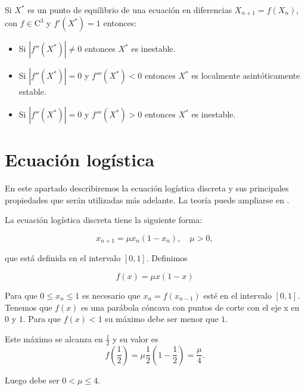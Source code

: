 \begin{proposition}
Si $X^*$ es un punto de equilibrio de una ecuación en diferencias $X_{n+1}=f(X_n)$, con $f\in\text{C}^3$ y $f'(X^*)=1$ entonces:
\begin{itemize}
\item Si $|f''(X^*)|\neq 0$ entonces $X^*$ es inestable.
\item Si $|f''(X^*)|=0$ y $f'''(X^*)<0$ entonces $X^*$ es localmente asintóticamente estable.
\item Si $|f''(X^*)|=0$ y $f'''(X^*)>0$ entonces $X^*$ es inestable.
\end{itemize}
\end{proposition}



\section{Ecuación logística}

En este apartado describiremos la ecuación logística discreta y sus principales propiedades que serán utilizadas más adelante. La teoría puede ampliarse en \cite{strogatzNonlinearDynamicsChaos1994}.

\begin{definition}
La ecuación logística discreta tiene la siguiente forma:

$$x_{n+1} = \mu x_n(1-x_n),\quad \mu > 0,$$

que está definida en el intervalo $ [ 0, 1 ] $. Definimos

$$f(x)=\mu x(1-x)$$

Para que $0\leq x_n\leq 1$ es necesario que $x_n=f(x_{n-1})$ esté en el intervalo $[0,1]$. Tenemos que $f(x)$ es una parábola cóncava con puntos de corte con el eje x en $0$ y $1$. Para que $f(x)<1$ su máximo debe ser menor que $1$.

Este máximo se alcanza en $\frac{1}{2}$ y su valor es
$$f\left(\frac{1}{2}\right) = \mu \frac{1}{2}\left(1-\frac{1}{2}\right) = \frac{\mu}{4}.$$

Luego debe ser $0< \mu \leq 4$.

\end{definition}


